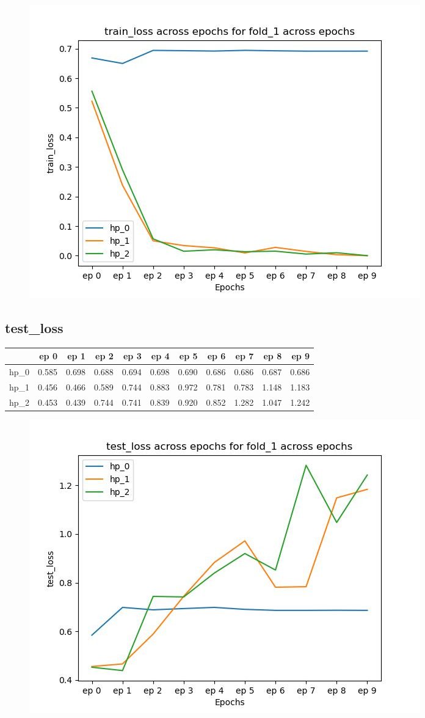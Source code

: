 \documentclass{article}
\begin{document}
\begin{figure}[H]
\includegraphics[scale = 0.75]{fold_1/train_loss}
\end{figure}
\subsection{test\_loss}
\begin{tabular}{lrrrrrrrrrr}
\toprule
{} &   ep 0 &   ep 1 &   ep 2 &   ep 3 &   ep 4 &   ep 5 &   ep 6 &   ep 7 &   ep 8 &   ep 9 \\
\midrule
hp\_0 &  0.585 &  0.698 &  0.688 &  0.694 &  0.698 &  0.690 &  0.686 &  0.686 &  0.687 &  0.686 \\
hp\_1 &  0.456 &  0.466 &  0.589 &  0.744 &  0.883 &  0.972 &  0.781 &  0.783 &  1.148 &  1.183 \\
hp\_2 &  0.453 &  0.439 &  0.744 &  0.741 &  0.839 &  0.920 &  0.852 &  1.282 &  1.047 &  1.242 \\
\bottomrule
\end{tabular}

\begin{figure}[H]
\includegraphics[scale = 0.75]{fold_1/test_loss}
\end{figure}
\end{document}
